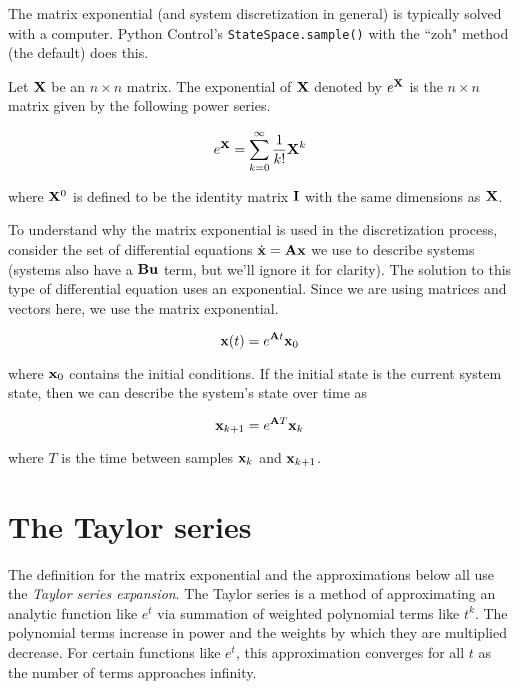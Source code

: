 The matrix exponential (and system discretization in general) is typically
solved with a computer. Python Control's \texttt{StateSpace.sample()} with the
``zoh" method (the default) does this.

\begin{definition}
  Let $\mathbf{X}$ be an $n \times n$ matrix. The exponential of $\mathbf{X}$ denoted
  by $e^{\mathbf{X}}$ is the $n \times n$ matrix given by the following power
  series.

  \begin{equation}
    e^{\mathbf{X}} = \sum_{k=0}^\infty \frac{1}{k!} \mathbf{X}^k \label{eq:mat_exp}
  \end{equation}

  where $\mathbf{X}^0$ is defined to be the identity matrix $\mathbf{I}$ with the same
  dimensions as $\mathbf{X}$.
\end{definition}

To understand why the matrix exponential is used in the discretization process,
consider the set of differential equations $\dot{\mathbf{x}} = \mathbf{A}\mathbf{x}$ we
use to describe systems (systems also have a $\mathbf{B}\mathbf{u}$ term, but we'll
ignore it for clarity). The solution to this type of differential equation uses
an exponential. Since we are using matrices and vectors here, we use the matrix
exponential.

\begin{equation*}
  \mathbf{x}(t) = e^{\mathbf{A}t} \mathbf{x}_0
\end{equation*}

where $\mathbf{x}_0$ contains the initial conditions. If the initial state is the
current system state, then we can describe the system's state over time as

\begin{equation*}
  \mathbf{x}_{k+1} = e^{\mathbf{A}T} \mathbf{x}_k
\end{equation*}

where $T$ is the time between samples $\mathbf{x}_k$ and $\mathbf{x}_{k+1}$.

\section{The Taylor series}
The definition for the matrix exponential and the approximations below all use
the \textit{Taylor series expansion}. The Taylor series is a method of
approximating an analytic function like $e^t$ via summation of weighted
polynomial terms like $t^k$. The polynomial terms increase in power and the
weights by which they are multiplied decrease. For certain functions like $e^t$,
this approximation converges for all $t$ as the number of terms approaches
infinity.


